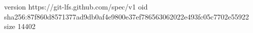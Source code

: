 version https://git-lfs.github.com/spec/v1
oid sha256:87f860d8571377ad9db0af4e9800e37ef786563062022e493fc05c7702e55922
size 14402

